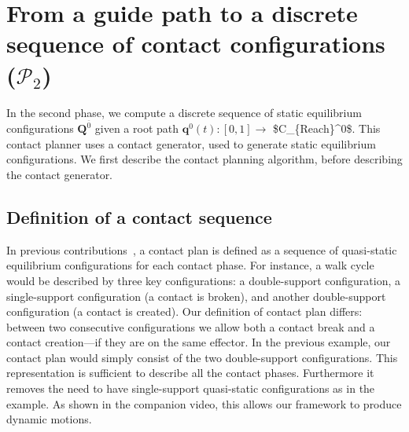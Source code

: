 \section{From a guide path to a discrete sequence of contact configurations ($\mathcal{P}_2$)}
\label{sec:contact}
In the second phase, we compute a discrete sequence of static equilibrium configurations $\mathbf{Q}^{\overline{0}}$ given a root path
$\mathbf{q}^0(t) : [0,1] \longrightarrow$ \gls{$C_{Reach}^0$}. This contact planner uses a contact generator, used to generate static equilibrium configurations. We first describe the contact planning algorithm, before describing
the contact generator.




\subsection{Definition of a contact sequence}
In previous contributions~\citep{DBLP:conf/iser/EscandeKMG08}, a contact plan is defined as a sequence of quasi-static equilibrium configurations
for each contact phase. For instance, a walk cycle would be described by three key configurations: a double-support configuration, a single-support configuration (a contact is broken), and another double-support configuration (a contact is created). 
Our definition of contact plan differs: between two consecutive configurations we allow both a contact break and a contact creation---if they are on the same effector. 
In the previous example, our contact plan would simply consist of the two double-support configurations. 
This representation is sufficient to describe all the contact phases. Furthermore it removes the need to have single-support quasi-static configurations as in the example. 
As shown in the companion video, this allows our framework to produce dynamic motions. 

